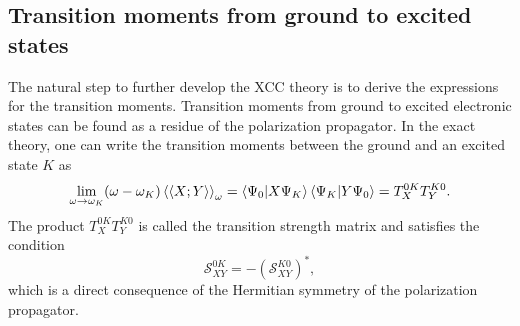 \documentclass[preprint,12pt]{elsarticle}
\newcommand{\SSS}{\mathcal{S}}
\newcommand{\equ}[1]{\begin{equation} #1 \end{equation}}
\newcommand{\equl}[2]{\begin{equation}\label{#2} #1 \end{equation}}
\newcommand{\rar}{\rightarrow}
\newcommand{\odp}{\braket{\braket{X;Y}}_\omega}
\begin{document}
\subsection{Transition moments from ground to excited states}
The natural step to further develop the XCC theory is to derive the expressions for the transition moments.
Transition moments from ground to excited electronic states can be found as a residue of the polarization propagator. 
In the exact theory, one can write the transition moments between the ground and an excited state $K$ as
\equ{
\lim_{\omega \rar \omega_K}(\omega - \omega_K)\odp
= \braket{\Psi_0|X \Psi_{K}}\braket{\Psi_{K}|Y\Psi_0} = T_X^{0K}T_Y^{K0}.
}
The product $T_X^{0K}T_Y^{K0}$ is called the transition strength matrix and satisfies the condition
\equl{\SSS_{XY}^{0K} = -(\SSS_{XY}^{K0})^*,
}{time-rev}
which is a direct consequence of the Hermitian symmetry of the polarization propagator.\cite{moszynski2005time}
\end{document}
